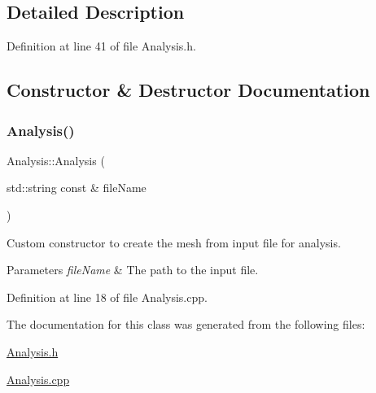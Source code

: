 \subsection{Detailed Description}


Definition at line 41 of file Analysis.\+h.



\subsection{Constructor \& Destructor Documentation}
\mbox{\label{class_analysis_aae14526bb70c6372fd662b46aab74d2d}} 
\subsubsection{\texorpdfstring{Analysis()}{Analysis()}}
{\footnotesize\ttfamily Analysis\+::\+Analysis (\begin{DoxyParamCaption}\item[{std\+::string const \&}]{file\+Name }\end{DoxyParamCaption})}



Custom constructor to create the mesh from input file for analysis. 


\begin{DoxyParams}{Parameters}
{\em file\+Name} & The path to the input file. \\
\hline
\end{DoxyParams}


Definition at line 18 of file Analysis.\+cpp.



The documentation for this class was generated from the following files\+:\begin{DoxyCompactItemize}
\item 
\mbox{\hyperlink{_analysis_8h}{Analysis.\+h}}\item 
\mbox{\hyperlink{_analysis_8cpp}{Analysis.\+cpp}}\end{DoxyCompactItemize}
